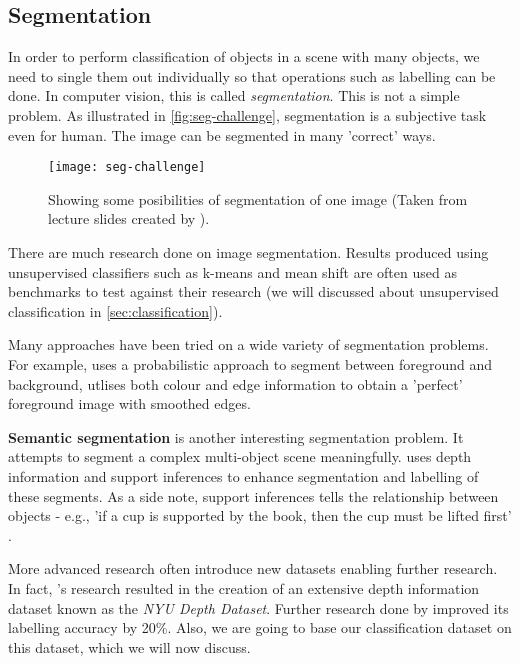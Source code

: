 \subsection{Segmentation}
In order to perform classification of objects in a scene with many objects, we need to single them out individually so that operations such as labelling can be done. In computer vision, this is called \textit{segmentation}. This is not a simple problem. As illustrated in \autoref{fig:seg-challenge}, segmentation is a subjective task even for human. The image can be segmented in many 'correct' ways.

\begin{figure}[H]
  \centering
  \texttt{[image: seg-challenge]}
  \caption{Showing some posibilities of segmentation of one image (Taken from lecture slides created by \protect{}).}
  \label{fig:seg-challenge}
\end{figure}

There are much research done on image segmentation. Results produced using unsupervised classifiers such as k-means and mean shift are often used as benchmarks to test against their research (we will discussed about unsupervised classification in \autoref{sec:classification}).

Many approaches have been tried on a wide variety of segmentation problems. For example,  uses a probabilistic approach to segment between foreground and background,  utlises both colour and edge information to obtain a 'perfect' foreground image with smoothed edges.

\textbf{Semantic segmentation} is another interesting segmentation problem. It attempts to segment a complex multi-object scene meaningfully.  uses depth information and support inferences to enhance segmentation and labelling of these segments. As a side note, support inferences tells the relationship between objects - e.g., 'if a cup is supported by the book, then the cup must be lifted first' \cite{nyu-dataset}.

More advanced research often introduce new datasets enabling further research. In fact, 's research resulted in the creation of an extensive depth information dataset known as the \textit{NYU Depth Dataset}. Further research done by  improved its labelling accuracy by 20\%. Also, we are going to base our classification dataset on this dataset, which we will now discuss.


